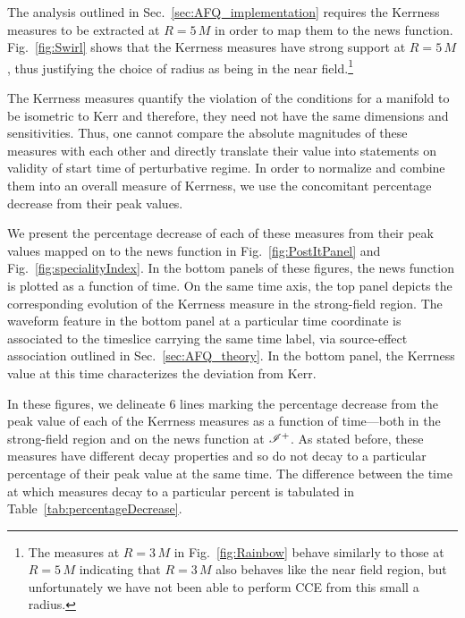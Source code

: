 \NoiseFloorFigure

The analysis outlined in Sec.~\ref{sec:AFQ_implementation} requires the Kerrness measures to be extracted at $R=5\,M$ in order to map them to the news function. Fig.~\ref{fig:Swirl} shows that the Kerrness measures have strong support at $R=5\,M$, thus justifying the choice of radius as being in the near field.\footnote{The measures at $R=3\,M$ in Fig.~\ref{fig:Rainbow} behave similarly to those at $R=5\,M$ indicating that $R=3\,M$ also behaves like the near field region, but unfortunately  we have not been able to perform CCE from this small a radius.}

The Kerrness measures quantify the violation of the conditions for a manifold to be isometric to Kerr and therefore, they need not have the same dimensions and sensitivities. Thus, one cannot compare the absolute magnitudes of these measures with each other and directly translate their value into statements on validity of start time of perturbative regime. In order to normalize and combine them into an overall measure of Kerrness,  we use the concomitant percentage decrease from their peak values. 

We present the percentage decrease of each of these measures from their peak values mapped on to the news function in Fig.~\ref{fig:PostItPanel} and Fig.~\ref{fig:specialityIndex}. In the bottom panels of these figures, the news function is plotted as a function of time. On the same time axis, the top panel depicts the corresponding evolution of the Kerrness measure in the strong-field region. The waveform feature in the bottom panel at a particular time coordinate is associated to the timeslice carrying the same time label, via source-effect association outlined in Sec.~\ref{sec:AFQ_theory}. In the bottom panel, the Kerrness value at this time characterizes the deviation from Kerr. 
\postIt

\postItSpecial

In these figures, we delineate 6 lines marking the percentage decrease from the peak value of each of the Kerrness measures as a function of time---both in the strong-field region and on the news function at $\mathscr{I^+}$. As stated before, these measures have different decay properties and so do not decay to a particular percentage of their peak value at the same time. The difference between the time at which measures decay to a particular percent is tabulated in Table~\ref{tab:percentageDecrease}.  

